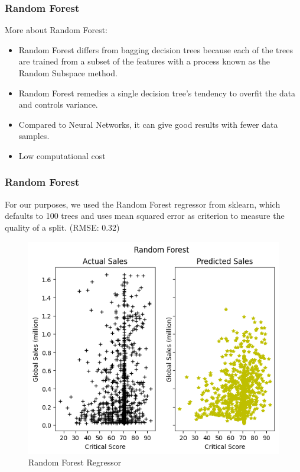 \begin{frame}
    \frametitle{Random Forest}
    More about Random Forest:
    \begin{itemize}
    \item Random Forest differs from bagging decision trees because each of the trees are trained from a subset of the features with a process known as the Random Subspace method. 
    \item Random Forest remedies a single decision tree's tendency to overfit the data and controls variance.
    \item Compared to Neural Networks, it can give good results with fewer data samples. 
    \item Low computational cost
    \end{itemize}
\end{frame}
\begin{frame}
    \frametitle{Random Forest}
    For our purposes, we used the Random Forest regressor from sklearn, which defaults to 100 trees and uses mean squared error as criterion to measure the quality of a split. (RMSE: 0.32)
    \begin{figure}[H]
        \centering
        \includegraphics[scale=0.5]{graphs/random_forest.png}
        \caption{Random Forest Regressor}
        \label{fig:N20}
    \end{figure}
\end{frame}